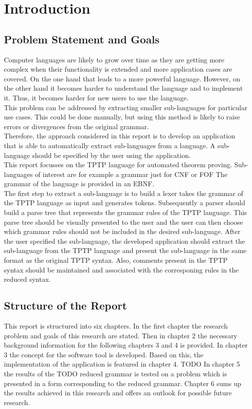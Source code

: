 
\chapter{Introduction}\label{cha:Introduction}

\section{Problem Statement and Goals}\label{sec:Aufgabenstellung}
Computer languages are likely to grow over time as they are getting more complex when their functionality is extended and more application cases are covered.
On the one hand that leads to a more powerful language.
However, on the other hand it becomes harder to understand the language and to implement it.
Thus, it becomes harder for new users to use the language.\\
This problem can be addressed by extracting smaller sub-languages for particular use cases. 
This could be done manually, but using this method is likely to raise errors or divergences from the original grammar.\\
Therefore, the approach considered in this report is to develop an application that is able to automatically extract sub-languages from a language.
A sub-language should be specified by the user using the application.\\
This report focusses on the \acf{TPTP} language for automated theorem proving.
Sub-languages of interest are for example a grammar just for \ac{CNF} or \ac{FOF}
The grammar of the language is provided in an \acf{EBNF}.\\
The first step to extract a sub-language is to build a lexer takes the grammar of the TPTP language as input and generates tokens.
Subsequently a parser should build a parse tree that represents the grammar rules of the \ac{TPTP} language.
This parse tree should be visually presented to the user and the user can then choose which grammar rules should not be included in the desired sub-language.
After the user specified the sub-language, the developed application should extract the sub-language from the \ac{TPTP} language and present the sub-language in the same format as the original \ac{TPTP} syntax.
Also, comments present in the \ac{TPTP} syntax should be maintained and associated with the corresponing rules in the reduced syntax.
\section{Structure of the Report}\label{sec:IntroductionStructure}
This report is structured into six chapters. In the first chapter the research problem and goals of this research are stated.
Then in chapter 2 the necessary background information for the following chapters 3 and 4 is provided.
In chapter 3 the concept for the software tool is developed.
Based on this, the implementation of the application is featured in chapter 4.
TODO In chapter 5 the results of the TODO reduced grammar is tested on a problem which is presented in a form corresponding to the reduced grammar.
Chapter 6 sums up the results achieved in this research and offers an outlook for possible future research.